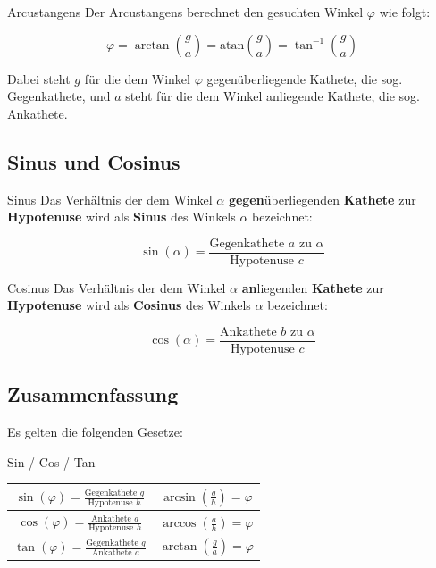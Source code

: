 \begin{bemerkung}{Arcustangens}{}
  Der Arcustangens berechnet den gesuchten Winkel $\varphi$ wie folgt:
  
  $$\varphi = \arctan\left(\frac{g}{a}\right) = \text{atan}\left(\frac{g}a\right) = \tan^{-1}\left(\frac{g}a\right)$$

  Dabei steht $g$ für die dem Winkel $\varphi$ gegenüberliegende Kathete, die
  sog. Gegenkathete, und  $a$ steht für die dem Winkel
  anliegende Kathete, die sog. Ankathete.

  \end{bemerkung}


\subsection{Sinus und Cosinus}

\begin{definition}{Sinus}{}
  Das Verhältnis der dem Winkel $\alpha$ \textbf{gegen}überliegenden \textbf{Kathete} zur \textbf{Hypotenuse}
  wird als \textbf{Sinus} des Winkels $\alpha$ bezeichnet:

  $$\sin(\alpha) = \frac{\text{Gegenkathete } a \text{ zu } \alpha}
  {\text{Hypotenuse } c}$$
\end{definition}

\begin{definition}{Cosinus}{}
  Das Verhältnis der dem Winkel $\alpha$ \textbf{an}liegenden \textbf{Kathete} zur \textbf{Hypotenuse}
  wird als \textbf{Cosinus}  des Winkels $\alpha$ bezeichnet:

  $$\cos(\alpha) = \frac{\text{Ankathete } b \text{ zu } \alpha}
  {\text{Hypotenuse } c}$$
\end{definition}

\newpage

\subsection{Zusammenfassung}
Es gelten die folgenden Gesetze:

\begin{gesetz}{Sin / Cos / Tan}{}
  
  \begin{tabular}{|c|c|}\hline
  $\sin(\varphi) = \frac{\text{Gegenkathete } g}{\text{Hypotenuse }  h}$  & $\arcsin\left(\frac{g}h\right) = \varphi$\\\hline
    $\cos(\varphi) = \frac{\text{Ankathete } a}{\text{Hypotenuse }  h}$  & $\arccos\left(\frac{a}h\right) = \varphi$\\\hline
  $\tan(\varphi) = \frac{\text{Gegenkathete } g}{\text{Ankathete }  a}$  & $\arctan\left(\frac{g}a\right) = \varphi$\\\hline
  \end{tabular}
  
\end{gesetz}


